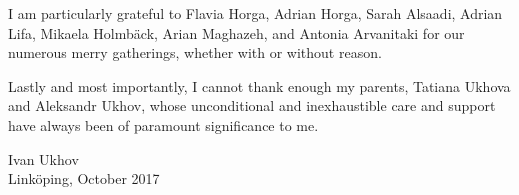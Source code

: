 I am particularly grateful to Flavia Horga, Adrian Horga, Sarah Alsaadi, Adrian
Lifa, Mikaela Holmbäck, Arian Maghazeh, and Antonia Arvanitaki for our numerous
merry gatherings, whether with or without reason.

Lastly and most importantly, I cannot thank enough my parents, Tatiana Ukhova
and Aleksandr Ukhov, whose unconditional and inexhaustible care and support have
always been of paramount significance to me.

\vspace{4em}
\hfill
\noindent
\begin{minipage}{0.35\textwidth}
  Ivan Ukhov\\
  Linköping, October 2017
\end{minipage}
